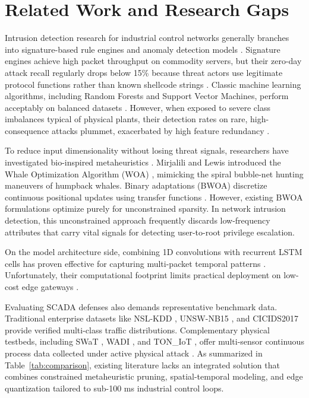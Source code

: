 \documentclass[conference]{IEEEtran}
\begin{document}
\section{Related Work and Research Gaps}
Intrusion detection research for industrial control networks generally branches into signature-based rule engines and anomaly detection models \cite{amin2013cyber, alanazi2022scada}. Signature engines achieve high packet throughput on commodity servers, but their zero-day attack recall regularly drops below 15\% because threat actors use legitimate protocol functions rather than known shellcode strings \cite{alanazi2022scada}. Classic machine learning algorithms, including Random Forests and Support Vector Machines, perform acceptably on balanced datasets \cite{ahmad2018performance}. However, when exposed to severe class imbalances typical of physical plants, their detection rates on rare, high-consequence attacks plummet, exacerbated by high feature redundancy \cite{chawla2002smote}.

To reduce input dimensionality without losing threat signals, researchers have investigated bio-inspired metaheuristics \cite{xue2016survey, holland1992adaptation, kennedy1995particle, eberhart1998comparison}. Mirjalili and Lewis introduced the Whale Optimization Algorithm (WOA) \cite{mirjalili2016whale}, mimicking the spiral bubble-net hunting maneuvers of humpback whales. Binary adaptations (BWOA) discretize continuous positional updates using transfer functions \cite{mafarja2017hybrid, ghosh2022bwoa, altashi2020binary}. However, existing BWOA formulations optimize purely for unconstrained sparsity. In network intrusion detection, this unconstrained approach frequently discards low-frequency attributes that carry vital signals for detecting user-to-root privilege escalation. 

On the model architecture side, combining 1D convolutions \cite{lecun1998gradient} with recurrent LSTM cells \cite{hochreiter1997long, shi2015convolutional} has proven effective for capturing multi-packet temporal patterns \cite{almomani2025cyberattack, yin2017deep, anand2024whale, krishnaveni2025hybrid}. Unfortunately, their computational footprint limits practical deployment on low-cost edge gateways \cite{jacob2018quantization, han2016deep, micikevicius2018mixed, dally2020hardware}. 

Evaluating SCADA defenses also demands representative benchmark data. Traditional enterprise datasets like NSL-KDD \cite{tavallaee2009detailed}, UNSW-NB15 \cite{moustafa2015unsw}, and CICIDS2017 \cite{sharafaldin2018toward} provide verified multi-class traffic distributions. Complementary physical testbeds, including SWaT \cite{goh2016dataset}, WADI \cite{ahmed2017wadi}, and TON\_IoT \cite{moustafa2021ton}, offer multi-sensor continuous process data collected under active physical attack \cite{taormina2018battle}. As summarized in Table~\ref{tab:comparison}, existing literature lacks an integrated solution that combines constrained metaheuristic pruning, spatial-temporal modeling, and edge quantization tailored to sub-100 ms industrial control loops.
\end{document}
